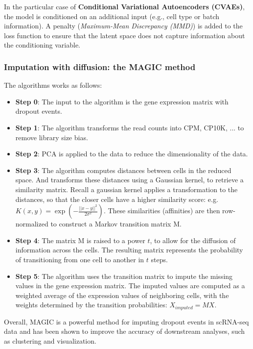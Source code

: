 \documentclass[a4paper]{article}
\begin{document}
In the particular case of \textbf{Conditional Variational Autoencoders (CVAEs)},
the model is conditioned on an additional input (e.g., cell type or batch
information). A penalty (\textit{Maximum-Mean Discrepancy (MMD)}) is added
to the loss function to ensure that the latent space does not capture
information about the conditioning variable.

\subsubsection*{Imputation with diffusion: the MAGIC method}

The algorithms works as follows:

\begin{itemize}
  \item \textbf{Step 0}: The input to the algorithm is the
  gene expression matrix with dropout events.
  \item \textbf{Step 1}: The algorithm transforms the read counts
  into CPM, CP10K, ... to remove library size bias.
  \item \textbf{Step 2}: PCA is applied to the data to reduce
  the dimensionality of the data.
  \item \textbf{Step 3}: The algorithm computes distances between
  cells in the reduced space. And transforms these distances using
  a Gaussian kernel, to retrieve a similarity matrix. Recall a gaussian
  kernel applies a transformation to the distances, so that the closer
  cells have a higher similarity score: e.g. \(K(x, y) = \exp(-\frac{||x - y||^2}{2\sigma^2})\). 
  These similarities
  (affinities) are then row-normalized to construct a Markov transition
  matrix M.
  \item \textbf{Step 4}: The matrix M is raised to a power \(t\), to
  allow for the diffusion of information across the cells. The resulting
  matrix represents the probability of transitioning from one cell to
  another in \(t\) steps.
  \item \textbf{Step 5}: The algorithm uses the transition matrix to
  impute the missing values in the gene expression matrix. The imputed
  values are computed as a weighted average of the expression values
  of neighboring cells, with the weights determined by the transition
  probabilities: \(X_{imputed} = MX\).

\end{itemize}

Overall, MAGIC is a powerful method for imputing dropout events in scRNA-seq data
and has been shown to improve the accuracy of downstream analyses, such as clustering
and visualization.
\end{document}
